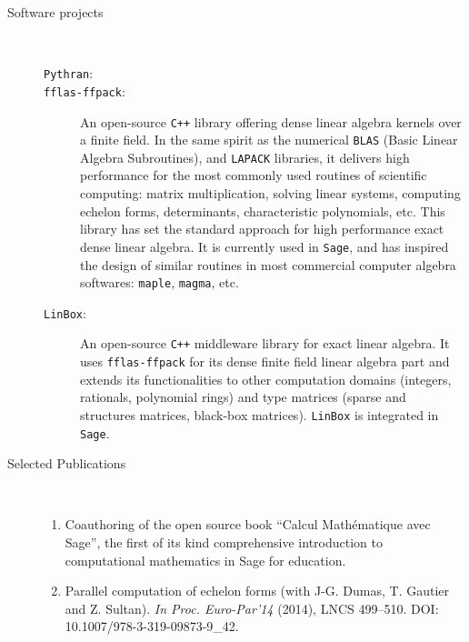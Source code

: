 \begin{description}
\item[Software projects]\
  \begin{description}
    \item[\texttt{Pythran}:] 
 \item[\texttt{fflas-ffpack}:] An open-source \texttt{C++} library offering dense
    linear algebra kernels over a finite field. In the same  spirit as the
    numerical \texttt{BLAS} (Basic Linear Algebra Subroutines), and
    \texttt{LAPACK} libraries, it delivers high performance for the most
    commonly used routines of scientific computing: matrix multiplication,
    solving linear systems, computing echelon forms, determinants,
    characteristic polynomials, etc. This library has set the standard
    approach for high performance exact dense linear algebra. It is currently
    used in \texttt{Sage}, and has inspired the design of similar routines in
    most commercial computer algebra softwares: \texttt{maple}, \texttt{magma}, etc.
  \item[\texttt{LinBox}:] An open-source \texttt{C++} middleware library for
    exact linear algebra. It uses \texttt{fflas-ffpack} for its dense finite
    field linear algebra part and extends its functionalities to other
    computation domains (integers, rationals, polynomial rings) and type
    matrices (sparse and structures matrices, black-box
    matrices). \texttt{LinBox} is integrated in \texttt{Sage}. 
  \end{description}
\item[Selected Publications]\ 
\medskip\noindent
\begin{enumerate}[1.]
\item Coauthoring of the open source book ``Calcul Mathématique avec
  Sage'', the first of its kind comprehensive introduction to
  computational mathematics in Sage for education.

\item Parallel computation of echelon forms (with J-G. Dumas, T. Gautier and Z. Sultan). 
\emph{In Proc. Euro-Par'14}  (2014),  LNCS 499--510. DOI: 10.1007/978-3-319-09873-9\_42.


\end{enumerate}
\end{description}

